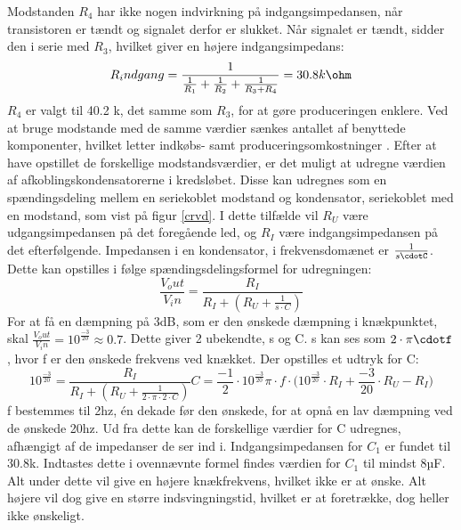 Modstanden $R_4$ har ikke nogen indvirkning på indgangsimpedansen, når transistoren er tændt og signalet derfor er slukket. Når signalet er tændt, sidder den i serie med $R_3$, hvilket giver en højere indgangsimpedans:
\begin{equation}
R_indgang=\frac{1}{\frac{1}{R_1}+\frac{1}{R_2}+\frac{1}{R_3+R_4}}=30.8k\ohm
\end{equation}
$R_4$ er valgt til 40.2 k\ohm, det samme som $R_3$, for at gøre produceringen enklere. Ved at bruge modstande med de samme værdier sænkes antallet af benyttede komponenter, hvilket letter indkøbs- samt produceringsomkostninger .
Efter at have opstillet de forskellige modstandsværdier, er det muligt at udregne værdien af afkoblingskondensatorerne i kredsløbet. Disse kan udregnes som en spændingsdeling mellem en seriekoblet modstand og kondensator, seriekoblet med en modstand, som vist på figur \ref{crvd}. I dette tilfælde vil $R_U$ være udgangsimpedansen på det foregående led, og $R_I$ være indgangsimpedansen på det efterfølgende. Impedansen i en kondensator, i frekvensdomænet er $\frac{1}{s\cdotC}$. Dette kan opstilles i følge spændingsdelingsformel for udregningen:
\begin{equation}
\frac{V_out}{V_in}=\frac{R_I}{R_I+(R_U+\frac{1}{s\cdot C})}
\end{equation}
For at få en dæmpning på 3dB, som er den ønskede dæmpning i knækpunktet, skal $\frac{V_out}{V_in}=10^{\frac{-3}{20}}\approx0.7$. 
Dette giver 2 ubekendte, s og C. s kan ses som $2\cdot\pi\cdotf$, hvor f er den ønskede frekvens ved knækket. Der opstilles et udtryk for C:
\begin{equation}
10^{\frac{-3}{20}}=\frac{R_I}{R_I+(R_U+\frac{1}{2\cdot\pi\cdot 2\cdot C})}
C=\frac{-1}{2}\cdot{10^{\frac{-3}{20}}}{\pi\cdot f\cdot(10^{\frac{-3}{20}}\cdot R_I+\frac{-3}{20}}\cdot R_U - R_I)
\end{equation}
f bestemmes til 2hz, én dekade før den ønskede, for at opnå en lav dæmpning ved de ønskede 20hz. Ud fra dette kan de forskellige værdier for C udregnes, afhængigt af de impedanser de ser ind i.
Indgangsimpedansen for $C_1$ er fundet til 30.8k\ohm . Indtastes dette i ovennævnte formel findes værdien for $C_1$ til mindst 8µF. Alt under dette vil give en højere knækfrekvens, hvilket ikke er at ønske. Alt højere vil dog give en større indsvingningstid, hvilket er at foretrække, dog heller ikke ønskeligt.